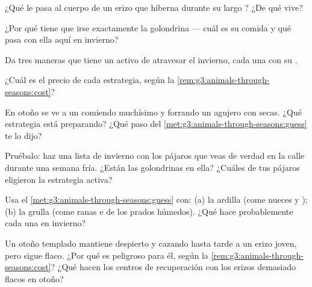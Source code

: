 \begin{exercise}[$\star$]\label{exo:g3:animals-through-seasons:3}
¿Qué le pasa al cuerpo de un erizo que hiberna durante su largo ?
¿De qué vive?
\end{exercise}

\begin{exercise}[$\star$]\label{exo:g3:animals-through-seasons:4}
¿Por qué tiene que irse exactamente la golondrina --- cuál es su
comida y qué pasa con ella aquí en invierno?
\end{exercise}

\begin{exercise}[$\star$]\label{exo:g3:animals-through-seasons:5}
Da tres maneras que tiene un  activo de atravesar el invierno,
cada una con su .
\end{exercise}

\begin{exercise}[$\star$]\label{exo:g3:animals-through-seasons:6}
¿Cuál es el precio de cada estrategia, según la
\cref{rem:g3:animals-through-seasons:cost}?
\end{exercise}

\begin{exercise}[$\star$]\label{exo:g3:animals-through-seasons:7}
En otoño se ve a un  comiendo muchísimo y forrando un agujero
con  secas. ¿Qué estrategia está preparando? ¿Qué paso del
\cref{met:g3:animals-through-seasons:guess} te lo dijo?
\end{exercise}

\begin{exercise}[$\star$]\label{exo:g3:animals-through-seasons:8}
Pruébalo: haz una lista de invierno con los pájaros que veas de verdad
en la calle durante una semana fría. ¿Están las golondrinas en ella?
¿Cuáles de tus pájaros eligieron la estrategia activa?
\end{exercise}

\begin{exercise}[$\star\star$]\label{exo:g3:animals-through-seasons:9}
Usa el \cref{met:g3:animals-through-seasons:guess} con: (a) la ardilla
(come nueces y ); (b) la grulla (come ranas e  de los
prados húmedos). ¿Qué hace probablemente cada una en invierno?
\end{exercise}

\begin{exercise}[$\star\star$]\label{exo:g3:animals-through-seasons:10}
Un otoño templado mantiene despierto y cazando hasta tarde a un erizo
joven, pero sigue flaco. ¿Por qué es peligroso para él, según la
\cref{rem:g3:animals-through-seasons:cost}? ¿Qué hacen los centros de
recuperación con los erizos demasiado flacos en otoño?
\end{exercise}
